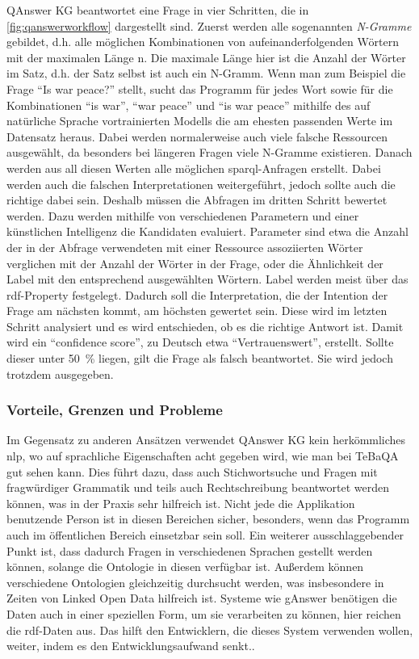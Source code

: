 QAnswer KG beantwortet eine Frage in vier Schritten, die in \cref{fig:qanswerworkflow} dargestellt sind.
Zuerst werden alle sogenannten \emph{N-Gramme} gebildet, d.h. alle möglichen Kombinationen von aufeinanderfolgenden Wörtern mit der maximalen Länge n.
Die maximale Länge hier ist die Anzahl der Wörter im Satz, d.h. der Satz selbst ist auch ein N-Gramm.
Wenn man zum Beispiel die Frage \enquote{Is war peace?} stellt,
sucht das Programm für jedes Wort sowie für die Kombinationen \enquote{is war}, \enquote{war peace} und \enquote{is war peace}
mithilfe des auf natürliche Sprache vortrainierten Modells die am ehesten passenden Werte im Datensatz heraus.
Dabei werden normalerweise auch viele falsche Ressourcen ausgewählt, da besonders bei längeren Fragen viele N-Gramme existieren.
Danach werden aus all diesen Werten alle möglichen \ac{sparql}-Anfragen erstellt.
Dabei werden auch die falschen Interpretationen weitergeführt, jedoch sollte auch die richtige dabei sein.
Deshalb müssen die Abfragen im dritten Schritt bewertet werden.
Dazu werden mithilfe von verschiedenen Parametern und einer künstlichen Intelligenz die Kandidaten evaluiert.
Parameter sind etwa die Anzahl der in der Abfrage verwendeten mit einer Ressource assoziierten Wörter verglichen mit der Anzahl der Wörter in der Frage,
oder die Ähnlichkeit der Label mit den entsprechend ausgewählten Wörtern.
Label werden meist über das \ac{rdf}-Property  festgelegt.
Dadurch soll die Interpretation, die der Intention der Frage am nächsten kommt, am höchsten gewertet sein.
Diese wird im letzten Schritt analysiert und es wird entschieden, ob es die richtige Antwort ist.
Damit wird ein \enquote{confidence score}, zu Deutsch etwa \enquote{Vertrauenswert}, erstellt.
Sollte dieser unter \SI{50}{\%} liegen, gilt die Frage als falsch beantwortet.
Sie wird jedoch trotzdem ausgegeben.

\subsubsection{Vorteile, Grenzen und Probleme}

Im Gegensatz zu anderen Ansätzen verwendet QAnswer KG kein herkömmliches \ac{nlp}, wo auf sprachliche Eigenschaften acht gegeben wird, wie man bei TeBaQA gut sehen kann.
Dies führt dazu, dass auch Stichwortsuche und Fragen mit fragwürdiger Grammatik und teils auch Rechtschreibung beantwortet werden können, was in der Praxis sehr hilfreich ist.
Nicht jede die Applikation benutzende Person ist in diesen Bereichen sicher, besonders, wenn das Programm auch im öffentlichen Bereich einsetzbar sein soll.
Ein weiterer ausschlaggebender Punkt ist, dass dadurch Fragen in verschiedenen Sprachen gestellt werden können, solange die Ontologie in diesen verfügbar ist.
Außerdem können verschiedene Ontologien gleichzeitig durchsucht werden, was insbesondere in Zeiten von Linked Open Data hilfreich ist.
Systeme wie gAnswer benötigen die Daten auch in einer speziellen Form, um sie verarbeiten zu können, hier reichen die \ac{rdf}-Daten aus.
Das hilft den Entwicklern, die dieses System verwenden wollen, weiter, indem es den Entwicklungsaufwand senkt..

